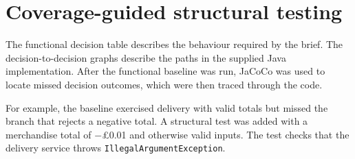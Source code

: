 \section{Coverage-guided structural testing}
The functional decision table describes the behaviour required by the
brief. The decision-to-decision graphs describe the paths in the supplied
Java implementation. After the functional baseline was run, JaCoCo was
used to locate missed decision outcomes, which were then traced through
the code.

For example, the baseline exercised delivery with valid totals but missed
the branch that rejects a negative total. A structural test was added
with a merchandise total of \(-\)\pounds0.01 and otherwise valid inputs.
The test checks that the delivery service throws
\texttt{IllegalArgumentException}.

